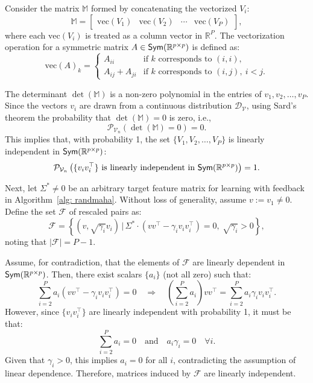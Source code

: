 Consider the matrix \( \mathbb{M} \) formed by concatenating the vectorized \( V_i \):
\[
\mathbb{M} = \begin{bmatrix} \text{vec}(V_1) & \text{vec}(V_2) & \cdots & \text{vec}(V_P) \end{bmatrix},
\]
where each \( \text{vec}(V_i) \) is treated as a column vector in \( \mathbb{R}^{P} \). The vectorization operation for a symmetric matrix \( A \in \textsf{Sym}(\mathbb{R}^{p\times p}) \) is defined as:
\[
\text{vec}(A)_k =
\begin{cases}
A_{ii} & \text{if } k \text{ corresponds to } (i,i), \\
A_{ij} + A_{ji} & \text{if } k \text{ corresponds to } (i,j),\ i < j.
\end{cases}
\]

The determinant \( \det(\mathbb{M}) \) is a non-zero polynomial in the entries of \( v_1, v_2, \ldots, v_P \). Since the vectors \( v_i \) are drawn from a continuous distribution \( \mathcal{D}_{\mathcal{V}} \), using Sard's theorem the probability that \( \det(\mathbb{M}) = 0 \) is zero, i.e.,
\[
\mathcal{P}_{\mathcal{V}_n}(\det(\mathbb{M}) = 0) = 0.
\]
This implies that, with probability 1, the set \( \{V_1, V_2, \ldots, V_P\} \) is linearly independent in \( \textsf{Sym}(\mathbb{R}^{p\times p}) \):
\begin{align}
\mathcal{P}_{\mathcal{V}_n}\left(\{v_i v_i^{\top}\} \text{ is linearly independent in } \textsf{Sym}(\mathbb{R}^{p\times p})\right) = 1. \label{eq: independence}
\end{align}


Next, let \( \Sigma^* \neq 0 \) be an arbitrary target feature matrix for learning with feedback in Algorithm~\ref{alg: randmaha}. Without loss of generality, assume \( v := v_1 \neq 0 \). Define the set \( \mathcal{F} \) of rescaled pairs as:
\[
\mathcal{F} = \left\{ \left(v, \sqrt{\gamma_i} v_i\right) \,\bigg|\, \Sigma^* \cdot \left(v v^{\top} - \gamma_i v_i v_i^{\top}\right) = 0, \ \sqrt{\gamma_i} > 0 \right\},
\]
noting that \( |\mathcal{F}| = P - 1 \).

Assume, for contradiction, that the elements of \( \mathcal{F} \) are linearly dependent in \( \textsf{Sym}(\mathbb{R}^{p\times p}) \). Then, there exist scalars \( \{a_i\} \) (not all zero) such that:
\[
\sum_{i=2}^P a_i \left(v v^{\top} - \gamma_i v_i v_i^{\top}\right) = 0 \quad \Rightarrow \quad \left(\sum_{i=2}^P a_i\right) v v^{\top} = \sum_{i=2}^P a_i \gamma_i v_i v_i^{\top}.
\]
However, since \( \{v_i v_i^{\top}\} \) are linearly independent with probability 1, it must be that:
\[
\sum_{i=2}^P a_i = 0 \quad \text{and} \quad a_i \gamma_i = 0 \quad \forall i.
\]
Given that \( \gamma_i > 0 \), this implies \( a_i = 0 \) for all \( i \), contradicting the assumption of linear dependence. Therefore, matrices induced by \( \mathcal{F} \) are linearly independent.

